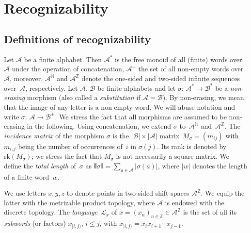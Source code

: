 \documentclass{amsart}
\theoremstyle{definition}
\theoremstyle{remark}
\numberwithin{equation}{section}
\begin{document}
\section{Recognizability} \label{sec:def}

\subsection{Definitions of recognizability}\label{sec:defdef}
Let $\mathcal{A}$ be a finite alphabet. Then $\mathcal{A}^*$ is the free monoid of all (finite) words over $\mathcal{A}$ under the operation of concatenation, $\mathcal{A}^+$ the set of all non-empty words over $\mathcal{A}$, moreover, $\mathcal{A}^\mathbb{N}$ and $\mathcal{A}^\mathbb{Z}$ denote the one-sided and two-sided infinite sequences over~$\mathcal{A}$, respectively. Let $\mathcal{A},\, \mathcal{B}$ be finite alphabets and let $\sigma:\, \mathcal{A}^*\to \mathcal{B}^*$ be a \emph{non-erasing} morphism (also called a \emph{substitution} if $\mathcal{A} = \mathcal{B}$). By non-erasing, we mean that the image of any letter is a non-empty word. We will abuse notation and write  $\sigma:\, \mathcal{A} \to \mathcal{B}^+$.  We stress the fact that all morphisms are assumed to be non-erasing in the following.
Using concatenation, we extend $\sigma$ to~$\mathcal{A}^\mathbb{N}$ and~$\mathcal{A}^\mathbb{Z}$. 
The \emph{incidence matrix} of the morphism $\sigma$ is the $|\mathcal{B}| \times |\mathcal{A}|$ matrix~$M_\sigma=(m_{ij})$ with $m_{i,j}$ being the number of occurrences of~$i$ in $\sigma(j)$. 
Its rank is denoted by $\mathrm{rk}(M_\sigma)$; we stress the fact that $M_\sigma$ is not necessarily a square matrix.
We define the \emph{total length} of~$\sigma$ as $\interleave\sigma\interleave = \sum_{a\in\mathcal{A}} |\sigma(a)|$, where $|w|$ denotes the length of a finite word~$w$.

We use letters $x,y,z$ to denote points in two-sided shift spaces $\mathcal{A}^\mathbb{Z}$. We equip the latter with the metrizable product topology, where $\mathcal{A}$ is endowed with the discrete topology.   
The \emph{language}~$\mathcal{L}_x$ of $x = (x_n)_{n\in \mathbb Z} \in \mathcal{A}^\mathbb{Z}$ is the set of all its \emph{subwords} (or factors) $x_{[i,j)}$, $i \le j$, with $x_{[i,j)} = x_i x_{i+1}\cdots x_{j-1}$. 
\end{document}
